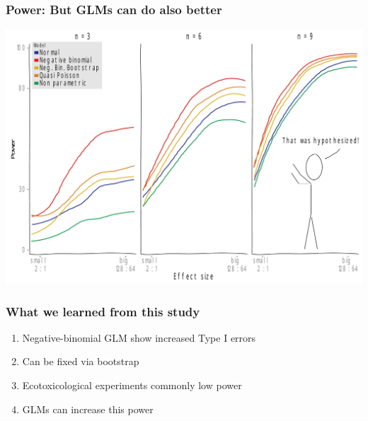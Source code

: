 \documentclass[
	12pt
	]{beamer}
\begin{document}
\begin{frame}
\frametitle{Power: But GLMs can do also better}
	\begin{center}
		\includegraphics[width = \textwidth]{figs/p_pow_xkcd.pdf}
	\end{center}
\end{frame}



\begin{frame}
\frametitle{What we learned from this study}
		\begin{enumerate}
			\item Negative-binomial GLM show increased \alert{Type I errors}
			\item Can be fixed via \alert{bootstrap}
			\item Ecotoxicological experiments commonly \alert{low power} 
			\item \alert{GLMs} can increase this  power
		\end{enumerate}
\end{frame}
\end{document}
